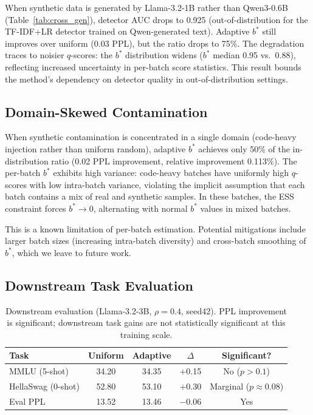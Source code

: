 \documentclass[11pt,a4paper]{article}
\newcommand{\bstar}{b^{*}}
\begin{document}
When synthetic data is generated by Llama-3.2-1B rather than Qwen3-0.6B (Table~\ref{tab:cross_gen}), detector AUC drops to 0.925 (out-of-distribution for the TF-IDF+LR detector trained on Qwen-generated text).
Adaptive $\bstar$ still improves over uniform (0.03 PPL), but the ratio drops to 75\%.
The degradation traces to noisier $q$-scores: the $\bstar$ distribution widens ($\bstar$ median 0.95 vs.\ 0.88), reflecting increased uncertainty in per-batch score statistics.
This result bounds the method's dependency on detector quality in out-of-distribution settings.

\subsection{Domain-Skewed Contamination}
\label{sec:domain_skewed}

When synthetic contamination is concentrated in a single domain (code-heavy injection rather than uniform random), adaptive $\bstar$ achieves only 50\% of the in-distribution ratio (0.02 PPL improvement, relative improvement 0.113\%).
The per-batch $\bstar$ exhibits high variance: code-heavy batches have uniformly high $q$-scores with low intra-batch variance, violating the implicit assumption that each batch contains a mix of real and synthetic samples.
In these batches, the ESS constraint forces $\bstar \to 0$, alternating with normal $\bstar$ values in mixed batches.

This is a known limitation of per-batch estimation.
Potential mitigations include larger batch sizes (increasing intra-batch diversity) and cross-batch smoothing of $\bstar$, which we leave to future work.

\subsection{Downstream Task Evaluation}
\label{sec:downstream}

\begin{table}[t]
\centering
\small
\caption{Downstream evaluation (Llama-3.2-3B, $\rho{=}0.4$, seed42). PPL improvement is significant; downstream task gains are not statistically significant at this training scale.}
\label{tab:downstream}
\begin{tabular}{lcccc}
\toprule
Task & Uniform & Adaptive & $\Delta$ & Significant? \\
\midrule
MMLU (5-shot) & 34.20 & 34.35 & $+$0.15 & No ($p > 0.1$) \\
HellaSwag (0-shot) & 52.80 & 53.10 & $+$0.30 & Marginal ($p \approx 0.08$) \\
Eval PPL & 13.52 & 13.46 & $-$0.06 & Yes \\
\bottomrule
\end{tabular}
\end{table}
\end{document}
